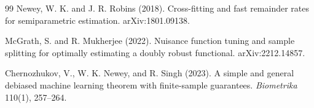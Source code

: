 \documentclass[11pt]{article}
\theoremstyle{definition}
\theoremstyle{plain}
\theoremstyle{remark}
\begin{document}
\begin{thebibliography}{99}
Newey, W. K. and J. R. Robins (2018).
Cross-fitting and fast remainder rates for semiparametric estimation.
arXiv:1801.09138.

McGrath, S. and R. Mukherjee (2022).
Nuisance function tuning and sample splitting for optimally estimating a doubly robust functional.
arXiv:2212.14857.

Chernozhukov, V., W. K. Newey, and R. Singh (2023).
A simple and general debiased machine learning theorem with finite-sample guarantees.
\emph{Biometrika} 110(1), 257--264.
\end{thebibliography}
\end{document}
